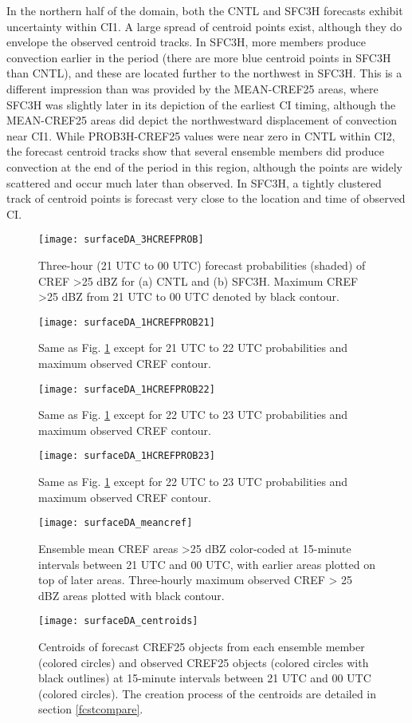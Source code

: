 In the northern half of the domain, both the CNTL and SFC3H forecasts exhibit uncertainty within CI1. A large spread of centroid points exist, although they do envelope the observed centroid tracks. In SFC3H, more members produce convection earlier in the period (there are more blue centroid points in SFC3H than CNTL), and these are located further to the northwest in SFC3H. This is a different impression than was provided by the MEAN-CREF25 areas, where SFC3H was slightly later in its depiction of the earliest CI timing, although the MEAN-CREF25 areas did depict the northwestward displacement of convection near CI1. While PROB3H-CREF25 values were near zero in CNTL within CI2, the forecast centroid tracks show that several ensemble members did produce convection at the end of the period in this region, although the points are widely scattered and occur much later than observed. In SFC3H, a tightly clustered track of centroid points is forecast very close to the location and time of observed CI.

\begin{figure}
\centering
\texttt{[image: surfaceDA\_3HCREFPROB]}
\caption{Three-hour (21 UTC to 00 UTC) forecast probabilities (shaded) of CREF \textgreater 25 dBZ for (a) CNTL and (b) SFC3H. Maximum CREF \textgreater 25 dBZ from 21 UTC to 00 UTC denoted by black contour.}
\label{sfc3hcrefprob}
\end{figure}
\begin{figure}
\centering
\texttt{[image: surfaceDA\_1HCREFPROB21]}
\caption{Same as Fig. \ref{sfc3hcrefprob} except for 21 UTC to 22 UTC probabilities and maximum observed CREF contour.}
\label{sfc1hrprob21}
\end{figure}
\begin{figure}
\centering
\texttt{[image: surfaceDA\_1HCREFPROB22]}
\caption{Same as Fig. \ref{sfc3hcrefprob} except for 22 UTC to 23 UTC probabilities and maximum observed CREF contour.}
\label{sfc1hrprob22}
\end{figure}
\begin{figure}
\centering
\texttt{[image: surfaceDA\_1HCREFPROB23]}
\caption{Same as Fig. \ref{sfc3hcrefprob} except for 22 UTC to 23 UTC probabilities and maximum observed CREF contour.}
\label{sfc1hrprob23}
\end{figure}
\begin{figure}
\centering
\texttt{[image: surfaceDA\_meancref]}
\caption{Ensemble mean CREF areas \textgreater 25 dBZ color-coded at 15-minute intervals between 21 UTC and 00 UTC, with earlier areas plotted on top of later areas. Three-hourly maximum observed CREF > 25 dBZ areas plotted with black contour.}
\label{sfcmeancref}
\end{figure}
\begin{figure}
\centering
\texttt{[image: surfaceDA\_centroids]}
\caption{Centroids of forecast CREF25 objects from each ensemble member (colored circles) and observed CREF25 objects (colored circles with black outlines) at 15-minute intervals between 21 UTC and 00 UTC (colored circles). The creation process of the centroids are detailed in section \ref{fcstcompare}. }
\label{sfccentroids}
\end{figure}

